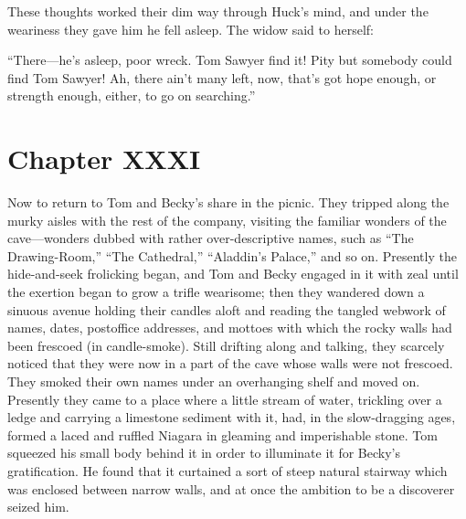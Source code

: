 \documentclass{book}
\begin{document}
These thoughts worked their dim way through Huck’s mind, and under the weariness they gave him he fell asleep. The widow said to herself:

“There—he’s asleep, poor wreck. Tom Sawyer find it! Pity but somebody could find Tom Sawyer! Ah, there ain’t many left, now, that’s got hope enough, or strength enough, either, to go on searching.”

\chapter*{Chapter XXXI}

Now to return to Tom and Becky’s share in the picnic. They tripped along the murky aisles with the rest of the company, visiting the familiar wonders of the cave—wonders dubbed with rather over-descriptive names, such as “The Drawing-Room,” “The Cathedral,” “Aladdin’s Palace,” and so on. Presently the hide-and-seek frolicking began, and Tom and Becky engaged in it with zeal until the exertion began to grow a trifle wearisome; then they wandered down a sinuous avenue holding their candles aloft and reading the tangled webwork of names, dates, postoffice addresses, and mottoes with which the rocky walls had been frescoed (in candle-smoke). Still drifting along and talking, they scarcely noticed that they were now in a part of the cave whose walls were not frescoed. They smoked their own names under an overhanging shelf and moved on. Presently they came to a place where a little stream of water, trickling over a ledge and carrying a limestone sediment with it, had, in the slow-dragging ages, formed a laced and ruffled Niagara in gleaming and imperishable stone. Tom squeezed his small body behind it in order to illuminate it for Becky’s gratification. He found that it curtained a sort of steep natural stairway which was enclosed between narrow walls, and at once the ambition to be a discoverer seized him.
\end{document}
